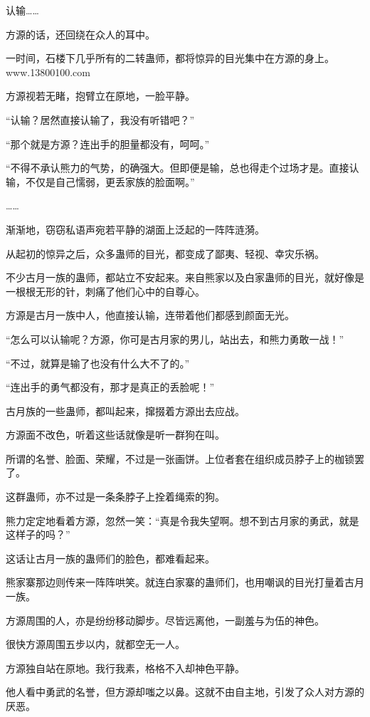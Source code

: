 
\begin{this_body}

认输……

方源的话，还回绕在众人的耳中。

一时间，石楼下几乎所有的二转蛊师，都将惊异的目光集中在方源的身上。www.13800100.com

方源视若无睹，抱臂立在原地，一脸平静。

“认输？居然直接认输了，我没有听错吧？”

“那个就是方源？连出手的胆量都没有，呵呵。”

“不得不承认熊力的气势，的确强大。但即便是输，总也得走个过场才是。直接认输，不仅是自己懦弱，更丢家族的脸面啊。”

……

渐渐地，窃窃私语声宛若平静的湖面上泛起的一阵阵涟漪。

从起初的惊异之后，众多蛊师的目光，都变成了鄙夷、轻视、幸灾乐祸。

不少古月一族的蛊师，都站立不安起来。来自熊家以及白家蛊师的目光，就好像是一根根无形的针，刺痛了他们心中的自尊心。

方源是古月一族中人，他直接认输，连带着他们都感到颜面无光。

“怎么可以认输呢？方源，你可是古月家的男儿，站出去，和熊力勇敢一战！”

“不过，就算是输了也没有什么大不了的。”

“连出手的勇气都没有，那才是真正的丢脸呢！”

古月族的一些蛊师，都叫起来，撺掇着方源出去应战。

方源面不改色，听着这些话就像是听一群狗在叫。

所谓的名誉、脸面、荣耀，不过是一张画饼。上位者套在组织成员脖子上的枷锁罢了。

这群蛊师，亦不过是一条条脖子上拴着绳索的狗。

熊力定定地看着方源，忽然一笑：“真是令我失望啊。想不到古月家的勇武，就是这样子的吗？”

这话让古月一族的蛊师们的脸色，都难看起来。

熊家寨那边则传来一阵阵哄笑。就连白家寨的蛊师们，也用嘲讽的目光打量着古月一族。

方源周围的人，亦是纷纷移动脚步。尽皆远离他，一副羞与为伍的神色。

很快方源周围五步以内，就都空无一人。

方源独自站在原地。我行我素，格格不入却神色平静。

他人看中勇武的名誉，但方源却嗤之以鼻。这就不由自主地，引发了众人对方源的厌恶。


\end{this_body}

